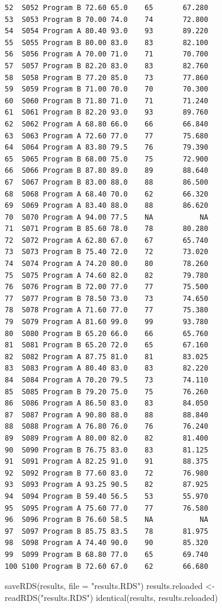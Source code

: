 \documentclass[
  letterpaper,
  DIV=11,
  numbers=noendperiod]{scrreprt}
\newenvironment{Shaded}{\begin{snugshade}}{\end{snugshade}}
\newcommand{\AttributeTok}[1]{\textcolor[rgb]{0.40,0.45,0.13}{#1}}
\newcommand{\FunctionTok}[1]{\textcolor[rgb]{0.28,0.35,0.67}{#1}}
\newcommand{\NormalTok}[1]{\textcolor[rgb]{0.00,0.23,0.31}{#1}}
\newcommand{\OtherTok}[1]{\textcolor[rgb]{0.00,0.23,0.31}{#1}}
\newcommand{\StringTok}[1]{\textcolor[rgb]{0.13,0.47,0.30}{#1}}
\begin{document}
\begin{verbatim}
52  S052 Program B 72.60 65.0    65       67.280
53  S053 Program B 70.00 74.0    74       72.800
54  S054 Program A 80.40 93.0    93       89.220
55  S055 Program B 80.00 83.0    83       82.100
56  S056 Program A 70.00 71.0    71       70.700
57  S057 Program B 82.20 83.0    83       82.760
58  S058 Program B 77.20 85.0    73       77.860
59  S059 Program B 71.00 70.0    70       70.300
60  S060 Program B 71.80 71.0    71       71.240
61  S061 Program B 82.20 93.0    93       89.760
62  S062 Program A 68.80 66.0    66       66.840
63  S063 Program A 72.60 77.0    77       75.680
64  S064 Program A 83.80 79.5    76       79.390
65  S065 Program B 68.00 75.0    75       72.900
66  S066 Program B 87.80 89.0    89       88.640
67  S067 Program B 83.00 88.0    88       86.500
68  S068 Program A 68.40 70.0    62       66.320
69  S069 Program A 83.40 88.0    88       86.620
70  S070 Program A 94.00 77.5    NA           NA
71  S071 Program B 85.60 78.0    78       80.280
72  S072 Program A 62.80 67.0    67       65.740
73  S073 Program B 75.40 72.0    72       73.020
74  S074 Program A 74.20 80.0    80       78.260
75  S075 Program A 74.60 82.0    82       79.780
76  S076 Program B 72.00 77.0    77       75.500
77  S077 Program B 78.50 73.0    73       74.650
78  S078 Program A 71.60 77.0    77       75.380
79  S079 Program A 81.60 99.0    99       93.780
80  S080 Program B 65.20 66.0    66       65.760
81  S081 Program B 65.20 72.0    65       67.160
82  S082 Program A 87.75 81.0    81       83.025
83  S083 Program A 80.40 83.0    83       82.220
84  S084 Program A 70.20 79.5    73       74.110
85  S085 Program B 79.20 75.0    75       76.260
86  S086 Program A 86.50 83.0    83       84.050
87  S087 Program A 90.80 88.0    88       88.840
88  S088 Program A 76.80 76.0    76       76.240
89  S089 Program A 80.00 82.0    82       81.400
90  S090 Program B 76.75 83.0    83       81.125
91  S091 Program A 82.25 91.0    91       88.375
92  S092 Program B 77.60 83.0    72       76.980
93  S093 Program A 93.25 90.5    82       87.925
94  S094 Program B 59.40 56.5    53       55.970
95  S095 Program A 75.60 77.0    77       76.580
96  S096 Program B 76.60 58.5    NA           NA
97  S097 Program B 85.75 83.5    78       81.975
98  S098 Program A 74.40 90.0    90       85.320
99  S099 Program B 68.80 77.0    65       69.740
100 S100 Program B 72.60 67.0    62       66.680
\end{verbatim}

\begin{Shaded}
\begin{Highlighting}[]
\FunctionTok{saveRDS}\NormalTok{(results, }\AttributeTok{file =} \StringTok{"results.RDS"}\NormalTok{)}
\NormalTok{results.reloaded }\OtherTok{\textless{}{-}} \FunctionTok{readRDS}\NormalTok{(}\StringTok{"results.RDS"}\NormalTok{)}
\FunctionTok{identical}\NormalTok{(results, results.reloaded)}
\end{Highlighting}
\end{Shaded}
\end{document}
